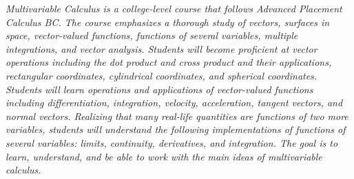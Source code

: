 \vspace{1mm}\emph{Multivariable Calculus is a college-level course that follows Advanced Placement Calculus BC. The course emphasizes a thorough study of vectors, surfaces in space, vector-valued functions, functions of several variables, multiple integrations, and vector analysis. Students will become proficient at vector operations including the dot product and cross product and their applications, rectangular coordinates, cylindrical coordinates, and spherical coordinates. Students will learn operations and applications of vector-valued functions including differentiation, integration, velocity, acceleration, tangent vectors, and normal vectors. Realizing that many real-life quantities are functions of two more variables, students will understand the following implementations of functions of several variables: limits, continuity, derivatives, and integration. The goal is to learn, understand, and be able to work with the main ideas of multivariable calculus.}\\

